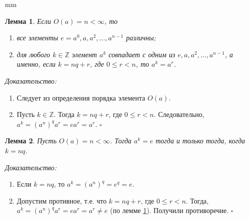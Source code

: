 \documentclass[12pt,english,russian]{article}
\newtheorem{lemma}{Лемма}
\begin{document}
		 mm
	\begin{lemma}
	\label{lemma1}
		Если $O(a) = n < \infty$, то
		\begin{enumerate}
			\item все элементы $e = a^0,a,a^2,\dots ,a^{n-1}$ различны;
			\item для любого $k \in \mathbb{Z}$ элемент $a^k$ совпадает с одним из
			$e,a,a^2,\dots ,a^{n-1}$, а именно, если $k=nq+r$, где
			$0 \leq r < n$, то $a^k=a^r$.
		\end{enumerate}
	\end{lemma}
		\textit{Доказательство:}
	\begin{enumerate}
		\item Следует из определения порядка элемента $O(a)$.
		\item Пусть $k \in \mathbb{Z}$. Тогда $k=nq+r$, где $0 \leq r < n$. 
		Следовательно, $a^k = (a^n)^qa^r = ea^r = a^r$. \quad $\square$
	\end{enumerate}
	
	\begin{lemma}
	\label{lemma2}
		Пусть $O(a) = n < \infty$. Тогда $a^k = e$ тогда и только тогда, когда $k = nq$.
	\end{lemma}
	\textit{Доказательство:}
	\begin{enumerate}
		\item Если  $k = nq$, то $a^k = (a^n)^q = e^q = e$.
		\item Допустим противное, т.е. что $k=nq+r$, где $0 \leq r < n$. 
		Тогда, $a^k = (a^n)^qa^r = ea^r = a^r\ne e$ (по лемме \ref{lemma1}).  Получили противоречие. \quad $\square$
	\end{enumerate}
	
\end{document}
